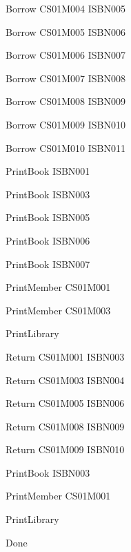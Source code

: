 Borrow
CS01M004 ISBN005

Borrow
CS01M005 ISBN006

Borrow
CS01M006 ISBN007

Borrow
CS01M007 ISBN008

Borrow
CS01M008 ISBN009

Borrow
CS01M009 ISBN010

Borrow
CS01M010 ISBN011

PrintBook
ISBN001

PrintBook
ISBN003

PrintBook
ISBN005

PrintBook
ISBN006

PrintBook
ISBN007

PrintMember
CS01M001

PrintMember
CS01M003

PrintLibrary

Return
CS01M001 ISBN003

Return
CS01M003 ISBN004

Return
CS01M005 ISBN006

Return
CS01M008 ISBN009

Return
CS01M009 ISBN010

PrintBook
ISBN003

PrintMember
CS01M001

PrintLibrary

Done
